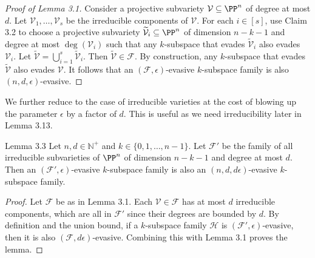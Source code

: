 \begin{proof}[Proof of Lemma 3.1]
Consider a projective subvariety $\mathcal V\subseteq\PP^n$ of degree at most $d$. Let $\mathcal V_1,\ldots,\mathcal V_s$ be the irreducible components of $\mathcal V$. For each $i\in[s]$, use Claim 3.2 to choose a projective subvariety $\widetilde{\mathcal V}_i\subseteq\PP^n$ of dimension $n-k-1$ and degree at most $\deg(\mathcal V_i)$ such that any $k$-subspace that evades $\widetilde{\mathcal V}_i$ also evades $\mathcal V_i$. Let $\widetilde{\mathcal V}=\bigcup_{i=1}^s\widetilde{\mathcal V}_i$. Then $\widetilde{\mathcal V}\in\mathcal F$. By construction, any $k$-subspace that evades $\widetilde{\mathcal V}$ also evades $\mathcal V$. It follows that an $(\mathcal F,\epsilon)$-evasive $k$-subspace family is also $(n,d,\epsilon)$-evasive.
\end{proof}
We further reduce to the case of irreducible varieties at the cost of blowing up the parameter $\epsilon$ by a factor of $d$. This is useful as we need irreducibility later in Lemma 3.13.
\begin{result}{Lemma 3.3}
Let $n,d\in\mathbb N^+$ and $k\in\{0,1,\ldots,n-1\}$. Let $\mathcal F'$ be the family of all irreducible subvarieties of $\PP^n$ of dimension $n-k-1$ and degree at most $d$. Then an $(\mathcal F',\epsilon)$-evasive $k$-subspace family is also an $(n,d,d\epsilon)$-evasive $k$-subspace family.
\end{result}
\begin{proof}
Let $\mathcal F$ be as in Lemma 3.1. Each $\mathcal V\in\mathcal F$ has at most $d$ irreducible components, which are all in $\mathcal F'$ since their degrees are bounded by $d$. By definition and the union bound, if a $k$-subspace family $\mathcal H$ is $(\mathcal F',\epsilon)$-evasive, then it is also $(\mathcal F,d\epsilon)$-evasive. Combining this with Lemma 3.1 proves the lemma.
\end{proof}
